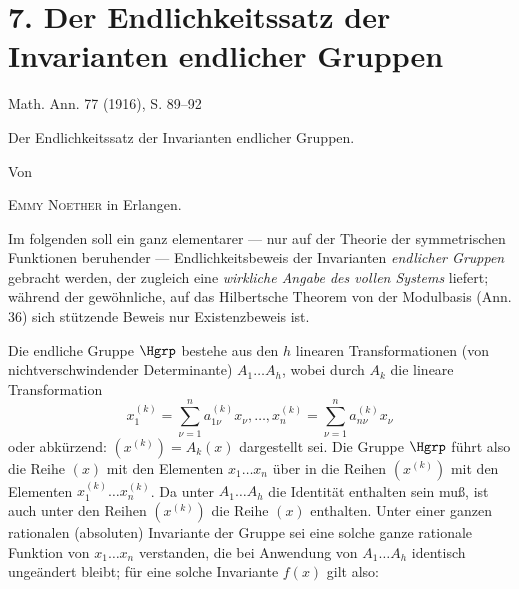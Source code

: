\section*{7. Der Endlichkeitssatz der Invarianten endlicher Gruppen}
\begin{center}
Math. Ann. 77 (1916), S. 89--92
\end{center}

\begin{center}
{\Large Der Endlichkeitssatz der Invarianten endlicher Gruppen.}\par
\vspace{1.2em}
Von\par
\vspace{0.8em}
{\scshape Emmy Noether} in Erlangen.
\end{center}

Im folgenden soll ein ganz elementarer --- nur auf der Theorie der symmetrischen Funktionen beruhender --- Endlichkeitsbeweis der Invarianten \emph{endlicher Gruppen} gebracht werden, der zugleich eine \emph{wirkliche Angabe des vollen Systems} liefert; während der gewöhnliche, auf das Hilbertsche Theorem von der Modulbasis (Ann. 36) sich stützende Beweis nur Existenzbeweis ist.

Die endliche Gruppe $\Hgrp$ bestehe aus den $h$ linearen Transformationen (von nichtverschwindender Determinante) $A_1\ldots A_h$, wobei durch $A_k$ die lineare Transformation
\[
  x_1^{(k)}=\sum_{\nu=1}^{n}a_{1\nu}^{(k)}x_\nu,\ldots,
  x_n^{(k)}=\sum_{\nu=1}^{n}a_{n\nu}^{(k)}x_\nu
\]
oder abkürzend: $(x^{(k)})=A_k(x)$ dargestellt sei. Die Gruppe $\Hgrp$ führt also die Reihe $(x)$ mit den Elementen $x_1\ldots x_n$ über in die Reihen $(x^{(k)})$ mit den Elementen $x_1^{(k)}\ldots x_n^{(k)}$. Da unter $A_1\ldots A_h$ die Identität enthalten sein muß, ist auch unter den Reihen $(x^{(k)})$ die Reihe $(x)$ enthalten. Unter einer ganzen rationalen (absoluten) Invariante der Gruppe sei eine solche ganze rationale Funktion von $x_1\ldots x_n$ verstanden, die bei Anwendung von $A_1\ldots A_h$ identisch ungeändert bleibt; für eine solche Invariante $f(x)$ gilt also:

